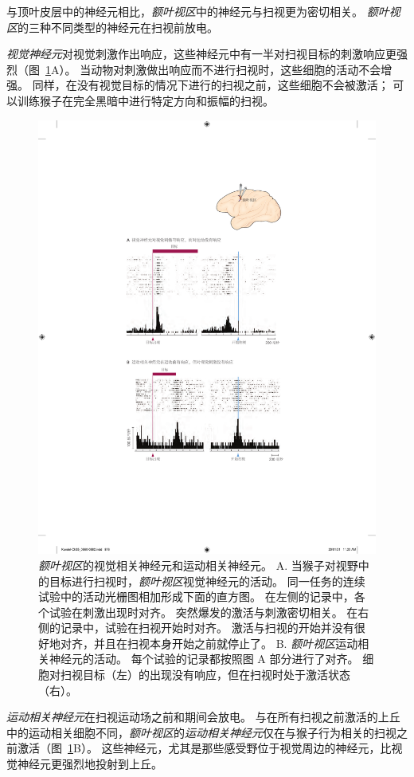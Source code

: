 与顶叶皮层中的神经元相比，\textit{额叶视区}中的神经元与扫视更为密切相关。
\textit{额叶视区}的三种不同类型的神经元在扫视前放电。


\textit{视觉神经元}对视觉刺激作出响应，这些神经元中有一半对扫视目标的刺激响应更强烈（图~\ref{fig:35_13}A）。
当动物对刺激做出响应而不进行扫视时，这些细胞的活动不会增强。
同样，在没有视觉目标的情况下进行的扫视之前，这些细胞不会被激活；
可以训练猴子在完全黑暗中进行特定方向和振幅的扫视。


\begin{figure}[htbp]
	\centering
	\includegraphics[width=0.8\linewidth]{chap35/fig_35_13}
	\caption{\textit{额叶视区}的视觉相关神经元和运动相关神经元\cite{bruce1985primate}。
		A. 当猴子对视野中的目标进行扫视时，\textit{额叶视区}视觉神经元的活动。
		同一任务的连续试验中的活动光栅图相加形成下面的直方图。
		在左侧的记录中，各个试验在刺激出现时对齐。
		突然爆发的激活与刺激密切相关。
		在右侧的记录中，试验在扫视开始时对齐。
		激活与扫视的开始并没有很好地对齐，并且在扫视本身开始之前就停止了。
		B. \textit{额叶视区}运动相关神经元的活动。
		每个试验的记录都按照图 A 部分进行了对齐。
		细胞对扫视目标（左）的出现没有响应，但在扫视时处于激活状态（右）。}
	\label{fig:35_13}
\end{figure}


\textit{运动相关神经元}在扫视运动场之前和期间会放电。
与在所有扫视之前激活的上丘中的运动相关细胞不同，\textit{额叶视区}的\textit{运动相关神经元}仅在与猴子行为相关的扫视之前激活（图~\ref{fig:35_13}B）。
这些神经元，尤其是那些感受野位于视觉周边的神经元，比视觉神经元更强烈地投射到上丘。


